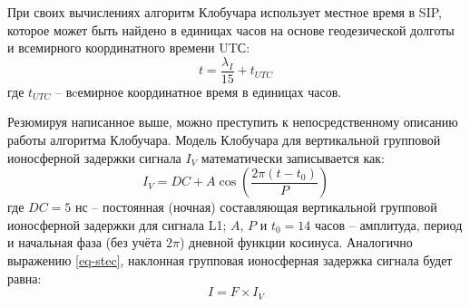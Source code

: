При своих вычислениях алгоритм Клобучара использует местное время в SIP, которое может быть найдено в единицах часов на основе геодезической долготы и всемирного координатного времени UTС:
\begin{equation}
t=\frac{\lambda_I}{15}+t_{UTC}
\label{eq-sip-time}
\end{equation}
где
$t_{UTC}$ -- вcемирное координатное время в единицах часов.  

Резюмируя написанное выше, можно преступить к непосредственному описанию работы алгоритма Клобучара.
Модель Клобучара для вертикальной групповой ионосферной задержки сигнала $I_V$ математически записывается как:
\begin{equation}
I_V=DC+A\cos\left(\frac{2\pi(t-t_0)}{P}\right)  
\label{eq-vion-delay}
\end{equation}
где 
$DC=5$ нс -- постоянная (ночная) составляющая вертикальной групповой ионосферной задержки для сигнала L1;
$A$, $P$ и $t_0=14$ часов -- амплитуда, период и начальная фаза (без учёта $2\pi$) дневной функции косинуса.
Аналогично выражению \eqref{eq-stec}, наклонная групповая ионосферная задержка сигнала будет равна:
\begin{equation}
I=F\times I_V
\label{eq-sion-delay}
\end{equation}

